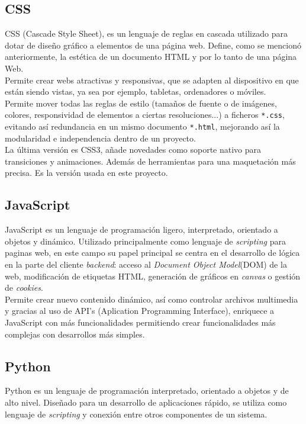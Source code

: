 \documentclass[11pt,a4paper]{book}
\begin{document}
			\subsection{CSS}
				CSS (Cascade Style Sheet), es un lenguaje de reglas en cascada utilizado para dotar de diseño gráfico a elementos de una página web. Define, como se mencionó anteriormente, la estética de un documento HTML y por lo tanto de una página Web. \\
				
				Permite crear webs atractivas y responsivas, que se adapten al dispositivo en que están siendo vistas, ya sea por ejemplo, tabletas, ordenadores o móviles.\\
				
				Permite mover todas las reglas de estilo (tamaños de fuente o de imágenes, colores, responsividad de elementos a ciertas resoluciones...) a ficheros \texttt{*.css}, evitando así redundancia en un mismo documento \texttt{*.html}, mejorando así la modularidad e independencia dentro de un proyecto.\\
								
				La última versión es CSS3, añade novedades como soporte nativo para transiciones y animaciones. Además de herramientas para una maquetación más precisa. Es la versión usada en este proyecto.
				
			\subsection{JavaScript}
				JavaScript \cite{JavaScript} es un lenguaje de programación ligero, interpretado, orientado a objetos y dinámico. Utilizado principalmente como lenguaje de \textit{scripting} para paginas web, en este campo su papel principal se centra en el desarrollo de lógica en la parte del cliente \textit{backend}: acceso al \textit{Document Object Model}(DOM) de la web, modificación de etiquetas HTML, generación de gráficos en \textit{canvas} o gestión de \textit{cookies}.\\
				
				Permite crear nuevo contenido dinámico, así como controlar archivos multimedia y gracias al uso de API's (Aplication Programming Interface), enriquece a JavaScript con más funcionalidades permitiendo crear funcionalidades más complejas con desarrollos más simples.
				
			\subsection{Python}
				Python es un lenguaje de programación interpretado, orientado a objetos y de alto nivel. Diseñado para un desarrollo de aplicaciones rápido, se utiliza como lenguaje de \textit{scripting} y conexión entre otros componentes de un sistema.\\
				
\end{document}
